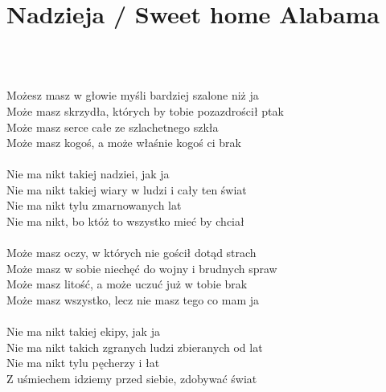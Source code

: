 \documentclass[a5paper, 10pt]{book}
\begin{document}
\section{Nadzieja / Sweet home Alabama}~\\~\\
\begin{minipage}[t]{0.8\textwidth}
  Możesz masz w głowie myśli bardziej szalone niż ja\\
  Może masz skrzydła, których by tobie pozazdrościł ptak\\
  Może masz serce całe ze szlachetnego szkła\\
  Może masz kogoś, a może właśnie kogoś ci brak\\
  \\
  \hspace*{5mm}Nie ma nikt takiej nadziei, jak ja\\
  \hspace*{5mm}Nie ma nikt takiej wiary w ludzi i cały ten świat\\
  \hspace*{5mm}Nie ma nikt tylu zmarnowanych lat\\
  \hspace*{5mm}Nie ma nikt, bo któż to wszystko mieć by chciał\\
  \\
  Może masz oczy, w których nie gościł dotąd strach\\
  Może masz w sobie niechęć do wojny i brudnych spraw\\
  Może masz litość, a może uczuć już w tobie brak\\
  Może masz wszystko, lecz nie masz tego co mam ja\\
  \\
  \hspace*{5mm}Nie ma nikt takiej ekipy, jak ja\\
  \hspace*{5mm}Nie ma nikt takich zgranych ludzi zbieranych od lat\\
  \hspace*{5mm}Nie ma nikt tylu pęcherzy i łat\\
  \hspace*{5mm}Z uśmiechem idziemy przed siebie, zdobywać świat\\


\end{minipage}
\end{document}
